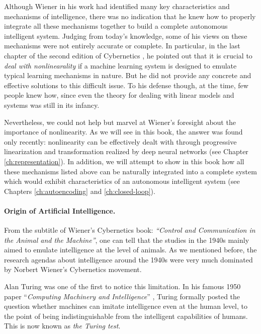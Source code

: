 \documentclass[../../book-main.tex]{subfiles}
\begin{document}
Although Wiener in his work had identified many key characteristics and mechanisms of intelligence, there was no indication that he knew how to properly integrate all these mechanisms together to build a complete autonomous intelligent system. Judging from today's knowledge, some of his views on these mechanisms were not entirely accurate or complete. In particular, in the last chapter of the second edition of Cybernetics \cite{Wiener-Cybernetics-1961}, he pointed out that it is crucial to {\em deal with nonlinearality} if a machine learning system is designed to emulate typical learning mechanisms in nature. But he did not provide any concrete and effective solutions to this difficult issue. To his defense though, at the time, few people knew how, since even the theory for dealing with linear models and systems was still in its infancy. 

Nevertheless, we could not help but marvel at Wiener's foresight about the importance of nonlinearity. As we will see in this book, the answer was found only recently: nonlinearity can be effectively dealt with through progressive linearization and transformation realized by deep neural networks (see Chapter \ref{ch:representation}). In addition, we will attempt to show in this book how all these mechanisms listed above can be naturally integrated into a complete system which would exhibit characteristics of an autonomous intelligent system (see Chapters \ref{ch:autoencoding} and \ref{ch:closed-loop}). 

\paragraph{Origin of Artificial Intelligence.}
From the subtitle of Wiener's Cybernetics book: {\em ``Control and Communication in the Animal and the Machine''}, one can tell that the studies in the 1940s mainly aimed to emulate intelligence at the level of animals. As we mentioned before, the research agendas about intelligence around the 1940s were very much dominated by Norbert Wiener's Cybernetics movement. 

Alan Turing was one of the first to notice this limitation. In his famous 1950 paper ``{\em Computing Machinery and Intelligence}'' \cite{Turing-1950}, Turing formally posted the question whether machines can imitate intelligence even at the human level, to the point of being indistinguishable from the intelligent capabilities of humans. This is now known as {\em the Turing test}. 
\end{document}
